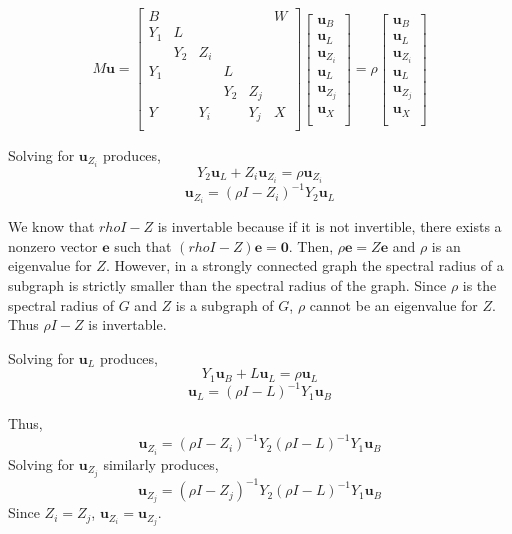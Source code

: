 \documentclass{paper}
\begin{document}
\[
M \mathbf{u}=
\begin{bmatrix}
B   & & & & & W\\
Y_1 & L & & \\
    & Y_2 & Z_i & \\
Y_1 & & & L \\
   & & & Y_2 & Z_j \\ 
Y  & & Y_i & & Y_j & X \\
\end{bmatrix} 
 \begin{bmatrix}
\mathbf{u}_B  \\
\mathbf{u}_{L} \\
\mathbf{u}_{Z_i} \\
\mathbf{u}_{L} \\
\mathbf{u}_{Z_j} \\
\mathbf{u}_{X} \\
\end{bmatrix}
=
\rho
\begin{bmatrix}
\mathbf{u}_B  \\
\mathbf{u}_{L} \\
\mathbf{u}_{Z_i} \\
\mathbf{u}_{L} \\
\mathbf{u}_{Z_j} \\
\mathbf{u}_{X} \\
\end{bmatrix}
\]

Solving for $\mathbf{u}_{Z_i}$ produces,
\[ 
Y_2 \mathbf{u}_{L} + Z_i\mathbf{u}_{Z_i} = \rho \mathbf{u}_{Z_i}
\]
\[ \mathbf{u}_{Z_i} = (\rho I-Z_i)^{-1} Y_2 \mathbf{u}_{L}
\]

We know that $rho I - Z$ is invertable because if it is not invertible, there exists a nonzero vector $\mathbf{e}$ such that $(rho I - Z)\mathbf{e} = \mathbf{0}$. Then, $\rho \mathbf{e} = Z\mathbf{e}$ and $\rho$ is an eigenvalue for $Z$. However, in a  strongly connected graph the spectral radius of a subgraph is strictly smaller than the spectral radius of the graph. Since $\rho$ is the spectral radius of $G$ and $Z$ is a subgraph of $G$, $\rho$ cannot be an eigenvalue for $Z$. Thus $\rho I - Z$ is invertable.

Solving for $\mathbf{u}_{L}$ produces,
\[ 
Y_1 \mathbf{u}_{B} + L \mathbf{u}_{L} = \rho \mathbf{u}_{L}
\]
\[ \mathbf{u}_{L} = (\rho I-L)^{-1} Y_1 \mathbf{u}_{B}
\]

Thus, \[ \mathbf{u}_{Z_i} = (\rho I-Z_i)^{-1} Y_2(\rho I-L)^{-1} Y_1 \mathbf{u}_{B} \]
Solving for  $\mathbf{u}_{Z_j}$ similarly produces,
\[ \mathbf{u}_{Z_j} = (\rho I-Z_j)^{-1} Y_2(\rho I-L)^{-1} Y_1 \mathbf{u}_{B} \]
Since $Z_i = Z_j$, $\mathbf{u}_{Z_i} = \mathbf{u}_{Z_j}$. 
\end{document}
